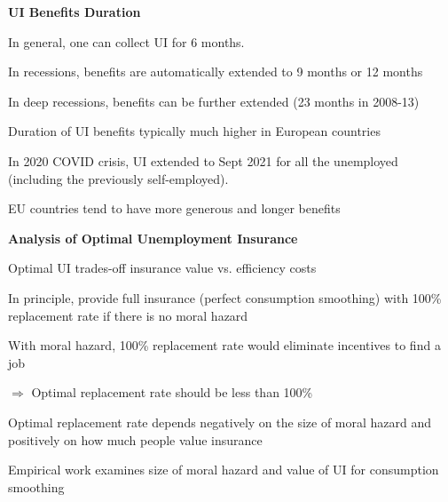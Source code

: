 \documentclass[landscape]{slides}
\begin{document}
\begin{slide}

\end{slide}


\begin{slide}
\begin{center}
{\bf UI  Benefits Duration}
\end{center}

In general, one can collect UI for 6 months.

In recessions, benefits are automatically extended to 9 months or 12 months

In deep recessions, benefits can be further extended (23 months in
2008-13)

Duration of UI benefits typically much higher in European countries

In 2020 COVID crisis, UI extended to Sept 2021 for all the unemployed (including
the previously self-employed).

EU countries tend to have more generous and longer benefits
\end{slide}

%

\begin{slide}
\begin{center}
{\bf Analysis of Optimal Unemployment Insurance}
\end{center}

Optimal UI trades-off insurance value vs. efficiency costs

In principle, provide full insurance (perfect consumption smoothing) with 100\% 
replacement rate if there is no moral hazard

With moral hazard, 100\% replacement rate would eliminate incentives to find a job

$\Rightarrow$ Optimal replacement rate should be less than 100\% %

Optimal replacement rate depends negatively on the size of moral hazard and positively
on how much people value insurance 

Empirical work examines size of moral hazard and value of UI for consumption smoothing


\end{slide}
\end{document}
